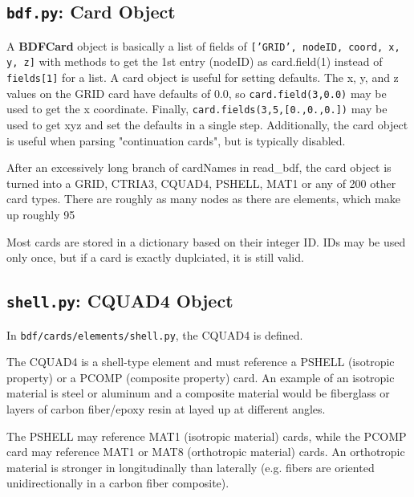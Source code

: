      
 \subsection{{\tt bdf.py}: Card Object}
     A {\bf BDFCard} object is basically a list of fields of {\tt ['GRID', nodeID, coord, x, y, z]}  with methods to get the 1st entry (nodeID) as card.field(1) instead of {\tt fields[1]} for a list.  A card object is useful for setting defaults.  The x, y, and z values on the GRID card have defaults of 0.0, so {\tt card.field(3,0.0)} may be used to get the x coordinate. Finally, {\tt card.fields(3,5,[0.,0.,0.])} may be used to get xyz and set the defaults in a single step.  Additionally, the card object is useful when parsing "continuation cards", but is typically disabled.  
     
     After an excessively long branch of cardNames in read_bdf, the card object is turned into a GRID, CTRIA3, CQUAD4, PSHELL, MAT1 or any of 200 other card types.  There are roughly as many nodes as there are elements, which make up roughly 95%
   
     Most cards are stored in a dictionary based on their integer ID.  IDs may be used only once, but if a card is exactly duplciated, it is still valid.

 \subsection{{\tt shell.py}: CQUAD4 Object}
     In {\tt bdf/cards/elements/shell.py}, the CQUAD4 is defined.
     
     The CQUAD4 is a shell-type element and must reference a PSHELL (isotropic property) or a PCOMP (composite property) card.  An example of an isotropic material is steel or aluminum and a composite material would be fiberglass or layers of carbon fiber/epoxy resin at layed up at different angles.
     
     The PSHELL may reference MAT1 (isotropic material) cards, while the PCOMP card may reference MAT1 or MAT8 (orthotropic material) cards.  An orthotropic material is stronger in longitudinally than laterally (e.g. fibers are oriented unidirectionally in a carbon fiber composite).
     
